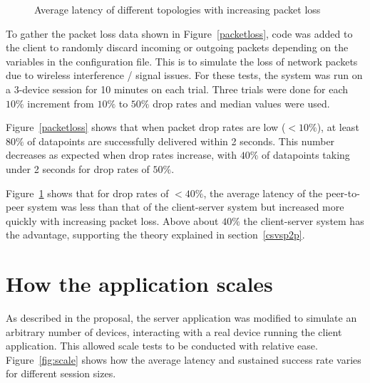 \begin{figure}[H]
\centering

\caption{Average latency of different topologies with increasing packet loss}
\label{packetlossline}
\end{figure}

To gather the packet loss data shown in Figure~\ref{packetloss}, code was added to the client to randomly discard incoming or outgoing packets depending on the variables in the configuration file. This is to simulate the loss of network packets due to wireless interference / signal issues. For these tests, the system was run on a 3-device session for 10 minutes on each trial. Three trials were done for each $10\%$ increment from $10\%$ to $50\%$ drop rates and median values were used.

Figure~\ref{packetloss} shows that when packet drop rates are low ($<10\%$), at least $80\%$ of datapoints are successfully delivered within 2 seconds. This number decreases as expected when drop rates increase, with $40\%$ of datapoints taking under 2 seconds for drop rates of $50\%$. 

Figure~\ref{packetlossline} shows that for drop rates of $<40\%$, the average latency of the peer-to-peer system was less than that of the client-server system but increased more quickly with increasing packet loss. Above about $40\%$ the client-server system has the advantage, supporting the theory explained in section~\ref{csvsp2p}.

\section{How the application scales}
\label{scaling}
As described in the proposal, the server application was modified to simulate an arbitrary number of devices, interacting with a real device running the client application. This allowed scale tests to be conducted with relative ease. Figure~\ref{fig:scale} shows how the average latency and sustained success rate varies for different session sizes.

